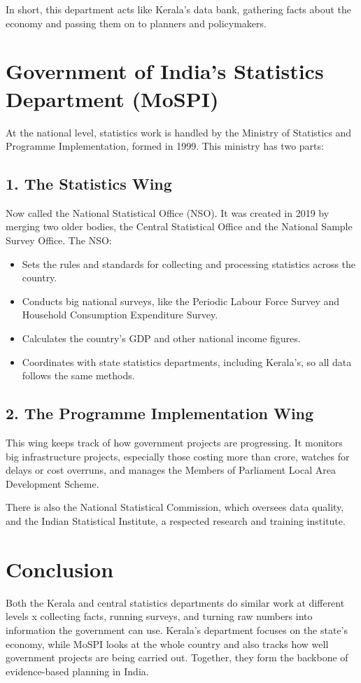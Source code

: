 \documentclass[12pt]{article}
\begin{document}
In short, this department acts like Kerala's data bank, gathering facts about the economy and passing them on to planners and policymakers.
 
\section*{Government of India's Statistics Department (MoSPI)}
At the national level, statistics work is handled by the Ministry of Statistics and Programme Implementation, formed in 1999. This ministry has two parts:
 
\subsection*{1. The Statistics Wing}
Now called the National Statistical Office (NSO). It was created in 2019 by merging two older bodies, the Central Statistical Office and the National Sample Survey Office. The NSO:
\begin{itemize}[leftmargin=*]
    \item Sets the rules and standards for collecting and processing statistics across the country.
    \item Conducts big national surveys, like the Periodic Labour Force Survey and Household Consumption Expenditure Survey.
    \item Calculates the country's GDP and other national income figures.
    \item Coordinates with state statistics departments, including Kerala's, so all data follows the same methods.
\end{itemize}
 
\subsection*{2. The Programme Implementation Wing}
This wing keeps track of how government projects are progressing. It monitors big infrastructure projects, especially those costing more than  crore, watches for delays or cost overruns, and manages the Members of Parliament Local Area Development Scheme.
 
There is also the National Statistical Commission, which oversees data quality, and the Indian Statistical Institute, a respected research and training institute.
 
\section*{Conclusion}
Both the Kerala and central statistics departments do similar work at different levels x collecting facts, running surveys, and turning raw numbers into information the government can use. Kerala's department focuses on the state's economy, while MoSPI looks at the whole country and also tracks how well government projects are being carried out. Together, they form the backbone of evidence-based planning in India.
 
\end{document}
